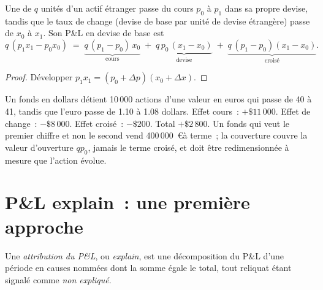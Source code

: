 \begin{proposition}\label{prop:m1:pnl-and-positions:fx}
Une  de $q$ unités d'un actif étranger passe du cours $p_0$ à $p_1$
dans sa propre devise, tandis que le taux de change (devise de base par unité de
devise étrangère) passe de $x_0$ à $x_1$. Son P\&L en devise de base est
\[
q\,(p_1x_1 - p_0x_0) \;=\; \underbrace{q\,(p_1-p_0)\,x_0}_{\text{cours}}
 \;+\; \underbrace{q\,p_0\,(x_1-x_0)}_{\text{devise}}
 \;+\; \underbrace{q\,(p_1-p_0)(x_1-x_0)}_{\text{croisé}} .
\]
\end{proposition}
\begin{proof}
Développer $p_1x_1 = (p_0 + \Delta p)(x_0 + \Delta x)$.
\end{proof}

\begin{example}\label{ex:m1:pnl-and-positions:fx}
Un fonds en dollars détient 10\,000 actions d'une valeur en euros qui passe de 40
à 41, tandis que l'euro passe de 1.10 à 1.08 dollars. Effet cours~: $+\$11\,000$.
Effet de change~: $-\$8\,000$. Effet croisé~: $-\$200$. Total $+\$2\,800$. Un fonds qui veut
le premier chiffre et non le second vend 400\,000~\euro à terme~; la couverture
couvre la valeur d'ouverture $qp_0$, jamais le terme croisé, et doit être redimensionnée à mesure
que l'action évolue.
\end{example}

\section{P\&L explain~: une première approche}

\begin{definition}[Attribution du P\&L]\label{def:m1:pnl-and-positions:attribution}
Une \emph{attribution du P\&L}, ou \emph{explain}, est une
décomposition du P\&L d'une période en causes nommées dont la somme égale le
total, tout reliquat étant signalé comme \emph{non expliqué}.
\end{definition}

